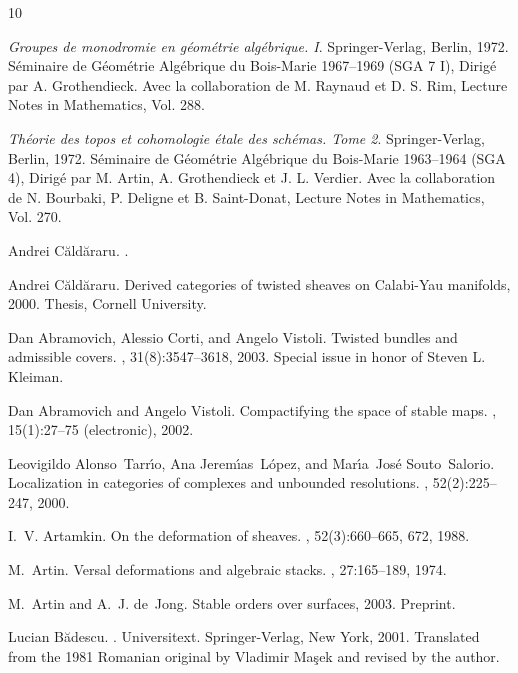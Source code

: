 \documentclass[11pt]{amsart}
\newcommand{\Caldararu}{C\u ald\u araru}
\renewcommand{\[}{[\!\hspace{0.03em}[}
\renewcommand{\]}{]\!\hspace{0.03em}]}
\renewcommand{\(}{(\!\hspace{0.03em}(}
\renewcommand{\)}{)\!\hspace{0.03em})}
\theoremstyle{definition}
\theoremstyle{remark}
\begin{document}
\begin{thebibliography}{10}

{\em Groupes de monodromie en g\'eom\'etrie alg\'ebrique. {I}}.
\newblock Springer-Verlag, Berlin, 1972.
\newblock S\'eminaire de G\'eom\'etrie Alg\'ebrique du Bois-Marie 1967--1969
  (SGA 7 I), Dirig\'e par A. Grothendieck. Avec la collaboration de M. Raynaud
  et D. S. Rim, Lecture Notes in Mathematics, Vol. 288.

{\em Th\'eorie des topos et cohomologie \'etale des sch\'emas. {T}ome 2}.
\newblock Springer-Verlag, Berlin, 1972.
\newblock S\'eminaire de G\'eom\'etrie Alg\'ebrique du Bois-Marie 1963--1964
  (SGA 4), Dirig\'e par M. Artin, A. Grothendieck et J. L. Verdier. Avec la
  collaboration de N. Bourbaki, P. Deligne et B. Saint-Donat, Lecture Notes in
  Mathematics, Vol. 270.

Andrei {\Caldararu}.
.

Andrei {\Caldararu}.
\newblock Derived categories of twisted sheaves on {C}alabi-{Y}au manifolds,
  2000.
\newblock Thesis, Cornell University.

Dan Abramovich, Alessio Corti, and Angelo Vistoli.
\newblock Twisted bundles and admissible covers.
, 31(8):3547--3618, 2003.
\newblock Special issue in honor of Steven L. Kleiman.

Dan Abramovich and Angelo Vistoli.
\newblock Compactifying the space of stable maps.
, 15(1):27--75 (electronic), 2002.

Leovigildo Alonso~Tarr{\'{\i}}o, Ana Jerem{\'{\i}}as~L{\'o}pez, and
  Mar{\'{\i}}a~Jos{\'e} Souto~Salorio.
\newblock Localization in categories of complexes and unbounded resolutions.
, 52(2):225--247, 2000.

I.~V. Artamkin.
\newblock On the deformation of sheaves.
, 52(3):660--665, 672, 1988.

M.~Artin.
\newblock Versal deformations and algebraic stacks.
, 27:165--189, 1974.

M.~Artin and A.~J. de~Jong.
\newblock Stable orders over surfaces, 2003.
\newblock Preprint.

Lucian B{\u{a}}descu.
.
\newblock Universitext. Springer-Verlag, New York, 2001.
\newblock Translated from the 1981 Romanian original by Vladimir Ma\c sek and
  revised by the author.


\end{thebibliography}
\end{document}
